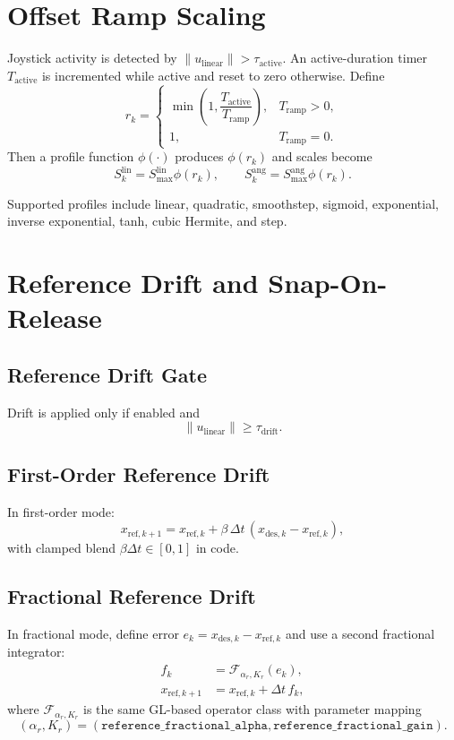 \documentclass[11pt,a4paper]{article}
\begin{document}
\section{Offset Ramp Scaling}
Joystick activity is detected by $\lVert u_{\text{linear}}\rVert > \tau_{\text{active}}$.
An active-duration timer $T_{\text{active}}$ is incremented while active and reset to zero otherwise.
Define
\begin{equation}
r_k =
\begin{cases}
\min\left(1,\dfrac{T_{\text{active}}}{T_{\text{ramp}}}\right), & T_{\text{ramp}} > 0,\\
1, & T_{\text{ramp}} = 0.
\end{cases}
\end{equation}
Then a profile function $\phi(\cdot)$ produces $\phi(r_k)$ and scales become
\begin{equation}
S^{\text{lin}}_k = S^{\text{lin}}_{\max}\phi(r_k), \qquad
S^{\text{ang}}_k = S^{\text{ang}}_{\max}\phi(r_k).
\end{equation}

Supported profiles include linear, quadratic, smoothstep, sigmoid, exponential, inverse exponential,
tanh, cubic Hermite, and step.

\section{Reference Drift and Snap-On-Release}
\subsection{Reference Drift Gate}
Drift is applied only if enabled and
\begin{equation}
\lVert u_{\text{linear}}\rVert \ge \tau_{\text{drift}}.
\end{equation}

\subsection{First-Order Reference Drift}
In first-order mode:
\begin{equation}
x_{\mathrm{ref},k+1} = x_{\mathrm{ref},k} + \beta\,\Delta t\,(x_{\mathrm{des},k}-x_{\mathrm{ref},k}),
\end{equation}
with clamped blend $\beta\Delta t\in[0,1]$ in code.

\subsection{Fractional Reference Drift}
In fractional mode, define error $e_k = x_{\mathrm{des},k}-x_{\mathrm{ref},k}$ and use a second fractional integrator:
\begin{align}
f_k &= \mathcal{F}_{\alpha_r,K_r}(e_k),\\
x_{\mathrm{ref},k+1} &= x_{\mathrm{ref},k} + \Delta t\, f_k,
\end{align}
where $\mathcal{F}_{\alpha_r,K_r}$ is the same GL-based operator class with parameter mapping
\begin{equation}
(\alpha_r,K_r)=\left(\texttt{reference\_fractional\_alpha},\texttt{reference\_fractional\_gain}\right).
\end{equation}
\end{document}
